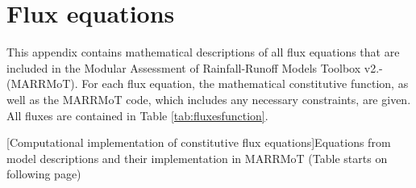 \chapter{Flux equations}
This appendix contains mathematical descriptions of all flux equations that are included in the Modular Assessment of Rainfall-Runoff Models Toolbox v2.- (MARRMoT).
For each flux equation, the mathematical constitutive function, as well as the MARRMoT code, which includes any necessary constraints, are given.
All fluxes are contained in Table \ref{tab:fluxesfunction}.




\vfill{}
[Computational implementation of constitutive flux equations]{Equations from model descriptions and their implementation in MARRMoT (Table starts on following page) \label{tab:fluxesfunction}}

\clearpage
{}
\recalctypearea


\clearpage
{}
\recalctypearea

